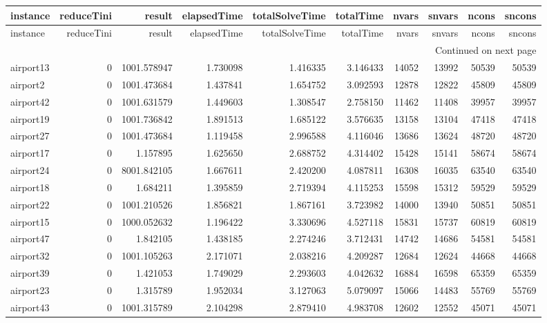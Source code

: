 \begin{longtable}{|l|r|r|r|r|r|r|r|r|r|}
\toprule
instance & reduceTini & result & elapsedTime & totalSolveTime & totalTime & nvars & snvars & ncons & sncons \\
\midrule
\endfirsthead
\toprule
instance & reduceTini & result & elapsedTime & totalSolveTime & totalTime & nvars & snvars & ncons & sncons \\
\midrule
\endhead
\midrule
\multicolumn{10}{r}{Continued on next page} \\
\midrule
\endfoot
\bottomrule
\endlastfoot
airport13 & 0 & 1001.578947 & 1.730098 & 1.416335 & 3.146433 & 14052 & 13992 & 50539 & 50539 \\
airport2 & 0 & 1001.473684 & 1.437841 & 1.654752 & 3.092593 & 12878 & 12822 & 45809 & 45809 \\
airport42 & 0 & 1001.631579 & 1.449603 & 1.308547 & 2.758150 & 11462 & 11408 & 39957 & 39957 \\
airport19 & 0 & 1001.736842 & 1.891513 & 1.685122 & 3.576635 & 13158 & 13104 & 47418 & 47418 \\
airport27 & 0 & 1001.473684 & 1.119458 & 2.996588 & 4.116046 & 13686 & 13624 & 48720 & 48720 \\
airport17 & 0 & 1.157895 & 1.625650 & 2.688752 & 4.314402 & 15428 & 15141 & 58674 & 58674 \\
airport24 & 0 & 8001.842105 & 1.667611 & 2.420200 & 4.087811 & 16308 & 16035 & 63540 & 63540 \\
airport18 & 0 & 1.684211 & 1.395859 & 2.719394 & 4.115253 & 15598 & 15312 & 59529 & 59529 \\
airport22 & 0 & 1001.210526 & 1.856821 & 1.867161 & 3.723982 & 14000 & 13940 & 50851 & 50851 \\
airport15 & 0 & 1000.052632 & 1.196422 & 3.330696 & 4.527118 & 15831 & 15737 & 60819 & 60819 \\
airport47 & 0 & 1.842105 & 1.438185 & 2.274246 & 3.712431 & 14742 & 14686 & 54581 & 54581 \\
airport32 & 0 & 1001.105263 & 2.171071 & 2.038216 & 4.209287 & 12684 & 12624 & 44668 & 44668 \\
airport39 & 0 & 1.421053 & 1.749029 & 2.293603 & 4.042632 & 16884 & 16598 & 65359 & 65359 \\
airport23 & 0 & 1.315789 & 1.952034 & 3.127063 & 5.079097 & 15066 & 14483 & 55769 & 55769 \\
airport43 & 0 & 1001.315789 & 2.104298 & 2.879410 & 4.983708 & 12602 & 12552 & 45071 & 45071 \\

\end{longtable}
